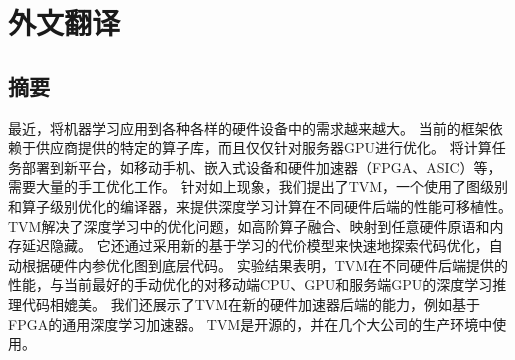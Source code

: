 \cleardoublepage
\chapter{外文翻译}

\section*{摘要}

最近，将机器学习应用到各种各样的硬件设备中的需求越来越大。
当前的框架依赖于供应商提供的特定的算子库，而且仅仅针对服务器GPU进行优化。
将计算任务部署到新平台，如移动手机、嵌入式设备和硬件加速器（FPGA、ASIC）等，需要大量的手工优化工作。
针对如上现象，我们提出了TVM，一个使用了图级别和算子级别优化的编译器，来提供深度学习计算在不同硬件后端的性能可移植性。
TVM解决了深度学习中的优化问题，如高阶算子融合、映射到任意硬件原语和内存延迟隐藏。
它还通过采用新的基于学习的代价模型来快速地探索代码优化，自动根据硬件内参优化图到底层代码。
实验结果表明，TVM在不同硬件后端提供的性能，与当前最好的手动优化的对移动端CPU、GPU和服务端GPU的深度学习推理代码相媲美。
我们还展示了TVM在新的硬件加速器后端的能力，例如基于FPGA的通用深度学习加速器。
TVM是开源的，并在几个大公司的生产环境中使用。

